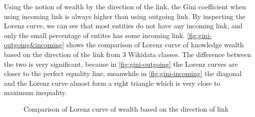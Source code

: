 
Using the notion of wealth by the direction of the link, the Gini coefficient when using incoming link is always higher than using outgoing link. By inspecting the Lorenz curve, we can see that most entities do not have any incoming link, and only the small percentage of entites has some incoming link. \autoref{fig:gini-outgoing&incoming} shows the comparison of Lorenz curve of knowledge wealth based on the direction of the link from 3 Wikidata classes. The difference between the two is very significant, because in \autoref{fig:gini-outgoing} the Lorenz curves are closer to the perfect equality line, meanwhile in \autoref{fig:gini-incoming} the diagonal and the Lorenz curve almost form a right triangle which is very close to maximum inequality.


\begin{figure}[!htbp]
    \centering 
    
    
    \caption{Comparison of Lorenz curve of wealth based on the direction of link} \label{fig:gini-outgoing&incoming}
    
\end{figure}